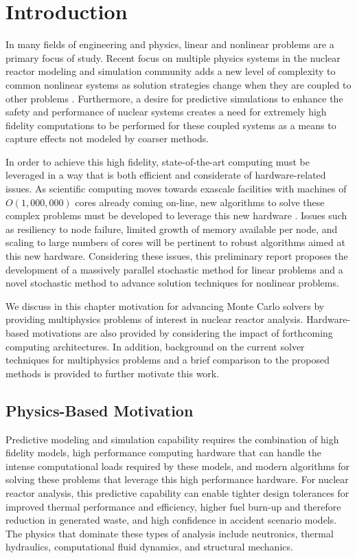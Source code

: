 \chapter{Introduction}
\label{ch:introduction}
In many fields of engineering and physics, linear and nonlinear
problems are a primary focus of study. Recent focus on multiple
physics systems in the nuclear reactor modeling and simulation
community adds a new level of complexity to common nonlinear systems
as solution strategies change when they are coupled to other problems
\citep{u.s._department_of_energy_casl_2011}. Furthermore, a desire
for predictive simulations to enhance the safety and performance of
nuclear systems creates a need for extremely high fidelity
computations to be performed for these coupled systems as a means to
capture effects not modeled by coarser methods.

In order to achieve this high fidelity, state-of-the-art computing
 must be leveraged in a way that is both efficient
and considerate of hardware-related issues. As scientific computing
moves towards exascale facilities with machines of $O(1,000,000)$
cores already coming on-line, new algorithms to solve these complex
problems must be developed to leverage this new hardware
\citep{kogge_using_2011}. Issues such as resiliency to node failure,
limited growth of memory available per node, and scaling to large
numbers of cores will be pertinent to robust algorithms aimed at this
new hardware. Considering these issues, this preliminary report
proposes the development of a massively parallel stochastic method for
linear problems and a novel stochastic method to advance solution
techniques for nonlinear problems.

We discuss in this chapter motivation for advancing Monte Carlo
solvers by providing multiphysics problems of interest in nuclear
reactor analysis. Hardware-based motivations are also provided by
considering the impact of forthcoming computing architectures. In
addition, background on the current solver techniques for multiphysics
problems and a brief comparison to the proposed methods is provided
to further motivate this work.

\section{Physics-Based Motivation}
\label{sec:physics_motivation}
Predictive modeling and simulation capability requires the combination
of high fidelity models, high performance computing hardware that can
handle the intense computational loads required by these models, and
modern algorithms for solving these problems that leverage this high
performance hardware. For nuclear reactor analysis, this predictive
capability can enable tighter design tolerances for improved thermal
performance and efficiency, higher fuel burn-up and therefore reduction
in generated waste, and high confidence in accident scenario
models. The physics that dominate these types of analysis include
neutronics, thermal hydraulics, computational fluid dynamics, and
structural mechanics.

